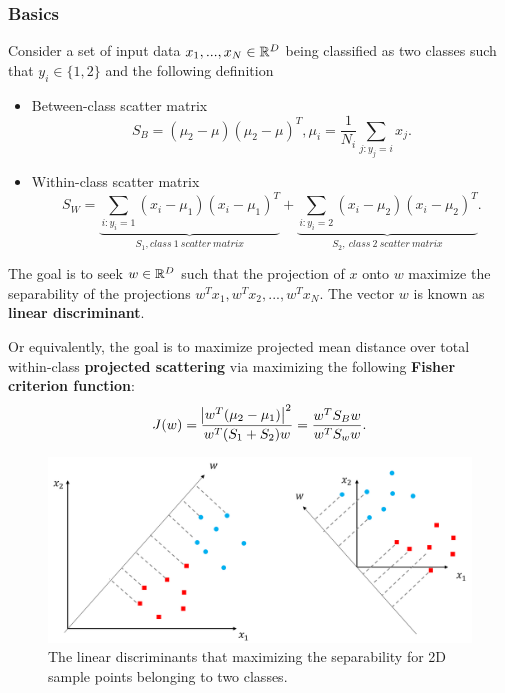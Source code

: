\begin{refsection}
\subsubsection{Basics}
\begin{definition}
	Consider a set of input data $x_1,...,x_N\in \mathbb{R}^D$ being classified as two classes such that $y_i\in \{1,2\}$ and the following definition	
	\begin{itemize}
		\item Between-class scatter matrix
		$$S_B = (\mu_2 - \mu)(\mu_2-\mu)^T, \mu_i = \frac{1}{N_i}\sum_{j:y_j=i} x_j.$$
		\item Within-class scatter matrix
		$$S_W = \underbrace{\sum_{i:y_i=1} (x_i - \mu_1)(x_i - \mu_1)^T}_{S_1,  class~1~scatter~matrix} + \underbrace{\sum_{i:y_i=2} (x_i - \mu_2)(x_i - \mu_2)^T}_{S_2, ~class~2~scatter~matrix}.$$
	\end{itemize}
	
	
	The goal is to seek $w\in \mathbb{R}^D$ such that the projection of $x$ onto $w$ maximize the separability of the projections $w^Tx_1, w^Tx_2,..., w^Tx_N$. The vector $w$ is known as \textbf{linear discriminant}. 
	
	Or equivalently, the goal is to maximize projected mean distance over total within-class \textbf{projected scattering} via maximizing the following \textbf{Fisher criterion function}:
	$$J(w) = \frac{\abs{w^T(\mu_2-\mu_1)}^2}{w^T(S_1+S_2)w} =\frac{w^TS_Bw}{w^TS_ww}.$$
\end{definition}


\begin{figure}[H]
	\centering
	\includegraphics[width=0.8\linewidth]{../figures/statisticalLearning/linearModelClassification/linearDiscriminateVectorDemo}
	\caption{The linear discriminants that maximizing the separability for 2D sample points belonging to two classes. }
	\label{fig:lineardiscriminatevectordemo}
\end{figure}



\end{refsection}
